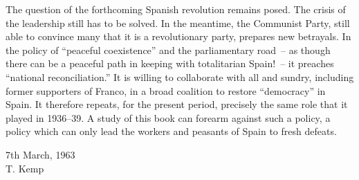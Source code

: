 \begin{sloppypar}
The question of the forthcoming Spanish revolution remains posed. The crisis of the leadership still has to be solved. In the meantime, the Communist Party, still able to convince many that it is a revolutionary party, prepares new betrayals. In the policy of ``peaceful coexistence'' and the parliamentary road~-- as though there can be a peaceful path in keeping with totalitarian Spain!~-- it preaches ``national reconciliation.'' It is willing to collaborate with all and sundry, including former supporters of Franco, in a broad coalition to restore ``democracy'' in Spain. It therefore repeats, for the present period, precisely the same role that it played in 1936--39. A study of this book can forearm against such a policy, a policy which can only lead the workers and peasants of Spain to fresh defeats.
\end{sloppypar}

\begin{flushright}
  7th March, 1963 \\
  T. Kemp
\end{flushright}